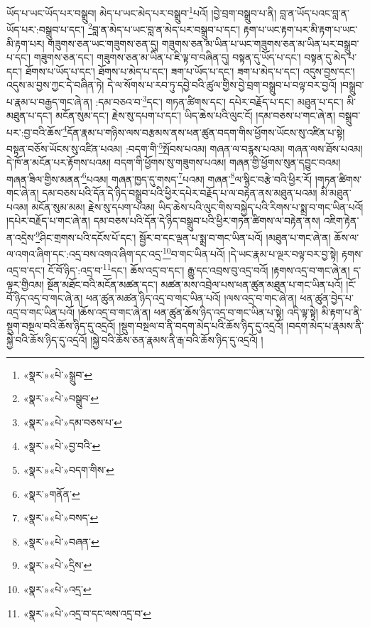 ཡོད་པ་ཡང་ཡོད་པར་བསྒྲུབ། མེད་པ་ཡང་མེད་པར་བསྒྲུབ་\footnote{«སྣར་»«པེ་»སྒྲུབ་}པའོ། །བྱེ་བྲག་བསྒྲུབ་པ་ནི། བླ་ན་ཡོད་པའང་བླ་ན་ཡོད་པར་:བསྒྲུབ་པ་དང་། \footnote{«སྣར་»«པེ་»བསྒྲུབ་}བླ་ན་མེད་པ་ཡང་བླ་ན་མེད་པར་བསྒྲུབ་པ་དང་། རྟག་པ་ཡང་རྟག་པར་མི་རྟག་པ་ཡང་མི་རྟག་པར། གཟུགས་ཅན་ཡང་གཟུགས་ཅན་དུ། གཟུགས་ཅན་མ་ཡིན་པ་ཡང་གཟུགས་ཅན་མ་ཡིན་པར་བསྒྲུབ་པ་དང་། གཟུགས་ཅན་དང་། གཟུགས་ཅན་མ་ཡིན་པ་ཇི་ལྟ་བ་བཞིན་དུ། བསྟན་དུ་ཡོད་པ་དང་། བསྟན་དུ་མེད་པ་དང་། ཐོགས་པ་ཡོད་པ་དང་། ཐོགས་པ་མེད་པ་དང་། ཟག་པ་ཡོད་པ་དང་། ཟག་པ་མེད་པ་དང་། འདུས་བྱས་དང་། འདུས་མ་བྱས་ཀྱང་དེ་བཞིན་ཏེ། དེ་ལ་སོགས་པ་རབ་ཏུ་དབྱེ་བའི་ཚུལ་གྱིས་བྱེ་བྲག་བསྒྲུབ་པ་བལྟ་བར་བྱའོ། །བསྒྲུབ་པ་རྣམ་པ་བརྒྱད་གང་ཞེ་ན། :དམ་བཅའ་བ་\footnote{«སྣར་»«པེ་»དམ་བཅས་པ་}དང་། གཏན་ཚིགས་དང་། དཔེར་བརྗོད་པ་དང་། མཐུན་པ་དང་། མི་མཐུན་པ་དང་། མངོན་སུམ་དང་། རྗེས་སུ་དཔག་པ་དང་། ཡིད་ཆེས་པའི་ལུང་ངོ། །དམ་བཅས་པ་གང་ཞེ་ན། བསྒྲུབ་པར་:བྱ་བའི་ཆོས་\footnote{«སྣར་»«པེ་»བྱ་བའི་}དོན་རྣམ་པ་གཉིས་ལས་བརྩམས་ནས་ཕན་ཚུན་བདག་གིས་ཕྱོགས་ཡོངས་སུ་འཛིན་པ་སྟེ། བསྟན་བཅོས་ཡོངས་སུ་འཛིན་པའམ། :བདག་གི་\footnote{«སྣར་»«པེ་»བདག་གིས་}སྤོབས་པའམ། གཞན་ལ་བརྙས་པའམ། གཞན་ལས་ཐོས་པའམ། དེ་ཁོ་ན་མངོན་པར་རྟོགས་པའམ། བདག་གི་ཕྱོགས་སུ་གཟུགས་པའམ། གཞན་གྱི་ཕྱོགས་སུན་དབྱུང་བའམ། གཞན་ཟིལ་གྱིས་མནན་\footnote{«སྣར་»གནོན་}པའམ། གཞན་ཁྱད་དུ་གསད་\footnote{«སྣར་»«པེ་»བསད་}པའམ། གཞན་\footnote{«སྣར་»«པེ་»བཞན་}ལ་སྙིང་བརྩེ་བའི་ཕྱིར་རོ། །གཏན་ཚིགས་གང་ཞེ་ན། དམ་བཅས་པའི་དོན་དེ་ཉིད་བསྒྲུབ་པའི་ཕྱིར་དཔེར་བརྗོད་པ་ལ་བརྟེན་ནས་མཐུན་པའམ། མི་མཐུན་པའམ། མངོན་སུམ་མམ། རྗེས་སུ་དཔག་པའམ། ཡིད་ཆེས་པའི་ལུང་གིས་བསྐྱེད་པའི་རིགས་པ་སྨྲ་བ་གང་ཡིན་པའོ། །དཔེར་བརྗོད་པ་གང་ཞེ་ན། དམ་བཅས་པའི་དོན་དེ་ཉིད་བསྒྲུབ་པའི་ཕྱིར་གཏན་ཚིགས་ལ་བརྟེན་ནས། འཇིག་རྟེན་ན་འདྲེས་\footnote{«སྣར་»«པེ་»དྲིས་}ཤིང་གྲགས་པའི་དངོས་པོ་དང་། སྦྱོར་བ་དང་ལྡན་པ་སྨྲ་བ་གང་ཡིན་པའོ། །མཐུན་པ་གང་ཞེ་ན། ཆོས་ལ་ལ་འགའ་ཞིག་དང་:འདྲ་བས་འགའ་ཞིག་དང་འདྲ་\footnote{«སྣར་»«པེ་»འདྲ་}བ་གང་ཡིན་པའོ། །དེ་ཡང་རྣམ་པ་ལྔར་བལྟ་བར་བྱ་སྟེ། རྟགས་འདྲ་བ་དང་། ངོ་བོ་ཉིད་:འདྲ་བ་\footnote{«སྣར་»«པེ་»འདྲ་བ་དང་ལས་འདྲ་བ་}དང་། ཆོས་འདྲ་བ་དང་། རྒྱུ་དང་འབྲས་བུ་འདྲ་བའོ། །རྟགས་འདྲ་བ་གང་ཞེ་ན། ད་ལྟར་གྱིའམ། སྔོན་མཐོང་བའི་མངོན་མཚན་དང་། མཚན་མས་འབྲེལ་པས་ཕན་ཚུན་མཐུན་པ་གང་ཡིན་པའོ། །ངོ་བོ་ཉིད་འདྲ་བ་གང་ཞེ་ན། ཕན་ཚུན་མཚན་ཉིད་འདྲ་བ་གང་ཡིན་པའོ། །ལས་འདྲ་བ་གང་ཞེ་ན། ཕན་ཚུན་བྱེད་པ་འདྲ་བ་གང་ཡིན་པའོ། །ཆོས་འདྲ་བ་གང་ཞེ་ན། ཕན་ཚུན་ཆོས་ཉིད་འདྲ་བ་གང་ཡིན་པ་སྟེ། འདི་ལྟ་སྟེ། མི་རྟག་པ་ནི་སྡུག་བསྔལ་བའི་ཆོས་ཉིད་དུ་འདྲའོ། །སྡུག་བསྔལ་བ་ནི་བདག་མེད་པའི་ཆོས་ཉིད་དུ་འདྲའོ། །བདག་མེད་པ་རྣམས་ནི་སྐྱེ་བའི་ཆོས་ཉིད་དུ་འདྲའོ། །སྐྱེ་བའི་ཆོས་ཅན་རྣམས་ནི་རྒ་བའི་ཆོས་ཉིད་དུ་འདྲའོ། །
